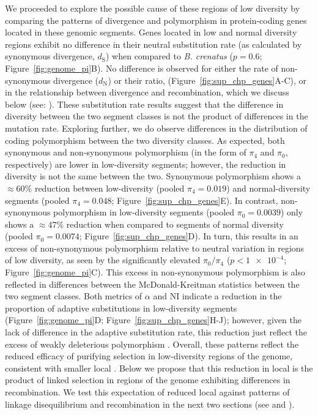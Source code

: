 We proceeded to explore the possible cause of these regions of low diversity by comparing
the patterns of divergence and polymorphism in protein-coding genes located in these
genomic segments.
Genes located in low and normal diversity regions exhibit no difference in their neutral
substitution rate (as calculated by synonymous divergence, $d_\text{S}$) when compared to
\textit{B. crenatus} ($p = 0.6$; Figure~\ref{fig:genome_pi}B).
No difference is observed for either the rate of non-synonymous divergence ($d_\text{N}$)
or their ratio, \dnds{} (Figure~\ref{fig:sup_chp_genes}A-C), or in the relationship between
divergence and recombination, which we discuss below (see: ).
These substitution rate results suggest that the difference in diversity between the two
segment classes is not the product of differences in the mutation rate.
Exploring further, we do observe differences in the distribution of coding polymorphism
between the two diversity classes.
As expected, both synonymous and non-synonymous polymorphism (in the form of $\pi_4$ and
$\pi_0$, respectively) are lower in low-diversity segments; however, the reduction in
diversity is not the same between the two.
Synonymous polymorphism shows a $\approx60\%$ reduction between low-diversity (pooled
$\pi_4 = 0.019$) and normal-diversity segments (pooled $\pi_4 = 0.048$;
Figure~\ref{fig:sup_chp_genes}E).
In contrast, non-synonymous polymorphism in low-diversity segments (pooled $\pi_0 = 0.0039$)
only shows a $\approx47\%$ reduction when compared to segments of normal diversity
(pooled $\pi_0 = 0.0074$; Figure~\ref{fig:sup_chp_genes}D).
In turn, this results in an excess of non-synonymous polymorphism relative to neutral
variation in regions of low diversity, as seen by the significantly elevated
$\pi_0/\pi_4$ ($p < \num{1e-4}$; Figure~\ref{fig:genome_pi}C).
This excess in non-synonymous polymorphism is also reflected in differences between
the McDonald-Kreitman statistics between the two segment classes.
Both metrics of $\alpha$ and NI indicate a reduction in the proportion of adaptive
substitutions in low-diversity segments (Figure~\ref{fig:genome_pi}D;
Figure~\ref{fig:sup_chp_genes}H-J); however, given the lack of difference in the
adaptive substitution rate, this reduction just reflect the excess of weakly deleterious
polymorphism .
Overall, these patterns reflect the reduced efficacy of purifying selection in 
low-diversity regions of the \bgla{} genome, consistent with smaller local \Ne{}
.
Below we propose that this reduction in local \Ne{} is the product of linked
selection in regions of the genome exhibiting differences in recombination.
We test this expectation of reduced local \Ne{} against patterns of linkage
disequilibrium and recombination in the next two sections (see 
and ).
\vspace{0.1cm}

